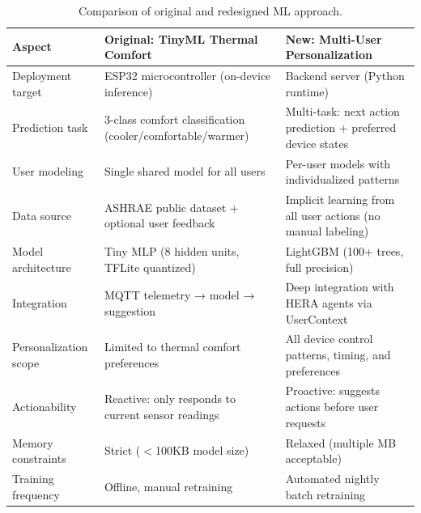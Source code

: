 \begin{table}[H]
    \centering
    \caption{Comparison of original and redesigned ML approach.}
    \label{tab:old-vs-new}
    \renewcommand{\arraystretch}{1.2}
    \small
    \begin{tabularx}{\textwidth}{@{} >{\raggedright\arraybackslash}p{3cm} X X @{}}
        \toprule
        \textbf{Aspect} & \textbf{Original: TinyML Thermal Comfort} & \textbf{New: Multi-User Personalization} \\
        \midrule
        Deployment target &
        ESP32 microcontroller (on-device inference) &
        Backend server (Python runtime) \\
        
        Prediction task &
        3-class comfort classification (cooler/comfortable/warmer) &
        Multi-task: next action prediction + preferred device states \\
        
        User modeling &
        Single shared model for all users &
        Per-user models with individualized patterns \\
        
        Data source &
        ASHRAE public dataset + optional user feedback &
        Implicit learning from all user actions (no manual labeling) \\
        
        Model architecture &
        Tiny MLP (8 hidden units, TFLite quantized) &
        LightGBM (100+ trees, full precision) \\
        
        Integration &
        MQTT telemetry → model → suggestion &
        Deep integration with HERA agents via UserContext \\
        
        Personalization scope &
        Limited to thermal comfort preferences &
        All device control patterns, timing, and preferences \\
        
        Actionability &
        Reactive: only responds to current sensor readings &
        Proactive: suggests actions before user requests \\
        
        Memory constraints &
        Strict ($<$100KB model size) &
        Relaxed (multiple MB acceptable) \\
        
        Training frequency &
        Offline, manual retraining &
        Automated nightly batch retraining \\
        \bottomrule
    \end{tabularx}
\end{table}

